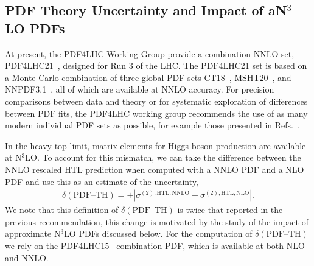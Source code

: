 \subsection{PDF Theory Uncertainty and Impact of aN$^3$LO PDFs}
\label{sec:ggf_an3lo_pdf}

At present, the PDF4LHC Working Group provide a combination NNLO set, PDF4LHC21~\cite{PDF4LHCWorkingGroup:2022cjn}, designed for Run 3 of the LHC.
The PDF4LHC21 set is based on a Monte Carlo combination of three global PDF sets  CT18~\cite{Hou:2019efy}, MSHT20~\cite{Bailey:2020ooq}, and NNPDF3.1~\cite{NNPDF:2017mvq}, all of which are available at NNLO accuracy.
For precision comparisons between data and theory or for systematic exploration of differences between PDF fits, the PDF4LHC working group recommends the use of as many modern individual PDF sets as possible, for example those presented in Refs.~\cite{Hou:2019efy,Alekhin:2024bhs,Bailey:2020ooq,NNPDF:2021njg}.

In the heavy-top limit, matrix elements for Higgs boson production are available at N$^3$LO.
To account for this mismatch, we can take the difference between the NNLO rescaled HTL prediction when computed with a NNLO PDF and a NLO PDF and use this as an estimate of the uncertainty,
\begin{align}
\delta(\mathrm{PDF\text{--}TH}) = \pm \left| \sigma^{(2),\mathrm{HTL},\mathrm{NNLO}} - \sigma^{(2),\mathrm{HTL},\mathrm{NLO}} \right|.
\label{eq:ggf_pdf_th}
\end{align}
We note that this definition of $\delta(\mathrm{PDF\text{--}TH})$ is twice that reported in the previous recommendation, this change is motivated by the study of the impact of approximate N$^3$LO PDFs discussed below.
For the computation of $\delta(\mathrm{PDF\text{--}TH})$ we rely on the PDF4LHC15~\cite{Butterworth:2015oua} combination PDF, which is available at both NLO and NNLO.

